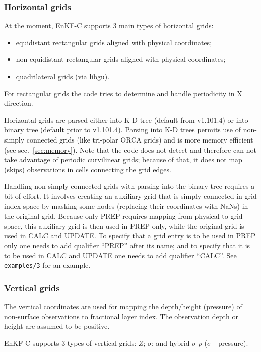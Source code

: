 \documentclass[11pt]{report}
\begin{document}
\subsubsection{Horizontal grids}
\label{sec:hgrid}

At the moment, EnKF-C supports 3 main types of horizontal grids:
\begin{itemize}
\item equidistant rectangular grids aligned with physical coordinates;
\item non-equidistant rectangular grids aligned with physical coordinates;
\item quadrilateral grids (via libgu).
\end{itemize}
For rectangular grids the code tries to determine and handle periodicity in X direction.

Horizontal grids are parsed either into K-D tree (default from v1.101.4) or into binary tree (default prior to v1.101.4).
Parsing into K-D trees permits use of non-simply connected grids (like tri-polar ORCA grids) and is more memory efficient (see sec.~\ref{sec:memory}).
Note that the code does not detect and therefore can not take advantage of periodic curvilinear grids; because of that, it does not map (skips) observations in cells connecting the grid edges.

Handling non-simply connected grids with parsing into the binary tree requires a bit of effort.
It involves creating an auxiliary grid that is simply connected in grid index space by masking some nodes (replacing their coordinates with NaNs) in the original grid.
Because only PREP requires mapping from physical to grid space, this auxiliary grid is then used in PREP only, while the original grid is used in CALC and UPDATE.
To specify that a grid entry is to be used in PREP only one needs to add qualifier ``PREP'' after its name; and to specify that it is to be used in CALC and UPDATE one needs to add qualifier ``CALC''.
See \verb|examples/3| for an example.

\subsubsection{Vertical grids}

The vertical coordinates are used for mapping the depth/height (pressure) of non-surface observations to fractional layer index.
The observation depth or height are assumed to be positive.

EnKF-C supports 3 types of vertical grids: $Z$; $\sigma$; and hybrid $\sigma$-$p$ ($\sigma$ - pressure).
\end{document}
